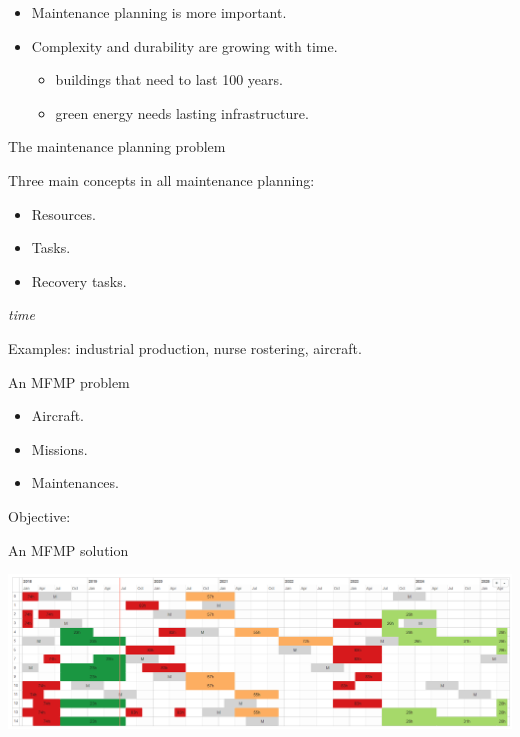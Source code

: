 \documentclass[usenames,dvipsnames]{beamer}
\begin{document}
\begin{itemize}[<+->]
\item
  Maintenance planning is more important.
\item
  Complexity and durability are growing with time.

  \begin{itemize}[<+->]
  
  \item
    buildings that need to last 100 years.
  \item
    green energy needs lasting infrastructure.
  \end{itemize}
\end{itemize}

\begin{frame}{The maintenance planning problem}
\protect\hypertarget{the-maintenance-planning-problem}{}

Three main concepts in all maintenance planning:

\begin{itemize}[<+->]

\item
  Resources.
\item
  Tasks.
\item
  Recovery tasks.
\end{itemize}

\emph{time}

Examples: industrial production, nurse rostering, aircraft.

\end{frame}

\begin{frame}{An MFMP problem}
\protect\hypertarget{an-mfmp-problem}{}

\begin{itemize}[<+->]

\item
  Aircraft.
\item
  Missions.
\item
  Maintenances.
\end{itemize}

Objective:

\end{frame}

\begin{frame}

\begin{block}{An MFMP solution}

\includegraphics[width=0.7\linewidth]{calendar3}

\end{block}

\end{frame}
\end{document}
